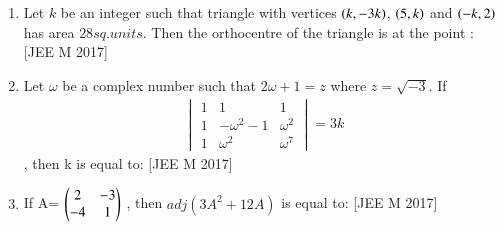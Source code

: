 \documentclass[journal,,12pt,twocolumn]{IEEEtran}
\theoremstyle{remark}
\begin{document}
\begin{enumerate}
    \item Let $k$ be an integer such that triangle with vertices $\left(k,-3k\right)$, $\left(5,k\right)$ and $\left(-k,2\right)$ has area $28 sq. units$. Then the orthocentre of the triangle is at the point :
    \hfill{[JEE M 2017]}
    \begin{enumerate}
    \end{enumerate}
    \item Let $\omega$ be a complex number such that $2\omega + 1=z$ where $z=\sqrt{-3}$. If \begin{align*}\begin{vmatrix}
1 & 1  & 1 \\
1 & -\omega^2-1 & \omega^2 \\
1 & \omega^2 & \omega^7 
\end{vmatrix}=3k \end{align*}, then k is equal to:
\hfill{[JEE M 2017]}
\begin{enumerate}
\end{enumerate}
\item If A= $\begin{pmatrix}
    2 & -3 \\
    -4 & 1
\end{pmatrix}$
    , then $adj(3A^2+12A)$ is equal to:
\hfill{[JEE M 2017]}
\begin{enumerate}
\end{enumerate}
\end{enumerate}
\end{document}
